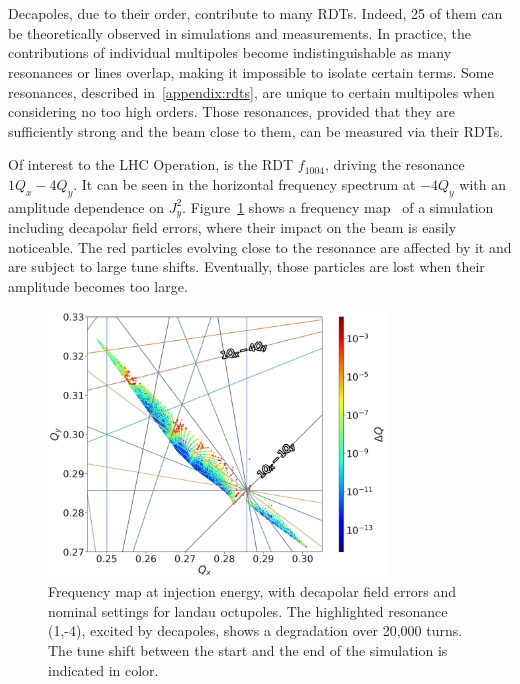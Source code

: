 \section{}

Decapoles, due to their order, contribute to many RDTs. Indeed, 25 of them can be theoretically 
observed in simulations and measurements. In practice, the contributions of individual multipoles
become indistinguishable as many resonances or lines overlap, making it impossible to isolate
certain terms. Some resonances, described in~\cref{appendix:rdts}, are unique to certain multipoles
when considering no too high orders. Those resonances, provided that they are sufficiently strong
and the beam close to them, can be measured via their RDTs.

Of interest to the LHC Operation, is the RDT $f_{1004}$, driving the resonance $1Q_x - 4Q_y$.
It can be seen in the horizontal frequency spectrum at $-4Q_y$ with an amplitude dependence on
$J_y^2$. 
Figure~\cref{fig:decapoles:rdts:tune_diagram} shows a frequency
map~\cite{yannis_papaphilippou_detecting_2014} of a simulation including decapolar field errors,
where their impact on the beam is easily noticeable. The red particles evolving close to the
resonance are affected by it and are subject to large tune shifts. Eventually, those particles are 
lost when their amplitude becomes too large.

\begin{figure}[!htb]
    \centering
    \includegraphics[width=0.8\textwidth]{./images/tune_diagram_f1004.pdf}
    \caption{Frequency map at injection energy, with decapolar field errors and nominal settings for
    landau octupoles. The highlighted resonance (1,-4), excited by decapoles, shows a degradation
    over 20,000 turns. The tune shift between the start and the end of the simulation is indicated
    in color.}
    \label{fig:decapoles:rdts:tune_diagram}
\end{figure}

